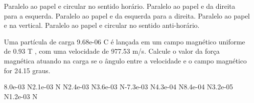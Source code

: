 \documentclass[12pt, addpoints]{exam}
\begin{document}
\begin{questions}
\begin{multicols*}{2}
\begin{choices}
\choice Paralelo ao papel e circular no sentido horário. 
\choice Paralelo ao papel e da direita para a esquerda. 
\choice Paralelo ao papel e da esquerda para a direita. 
\choice Paralelo ao papel e na vertical. 
\choice Paralelo ao papel e circular no sentido anti-horário. 
\end{choices}
\question Uma partícula de carga 9.68e-06 C é lançada em um campo magnético uniforme de    0.93 T , com uma velocidade de 977.53 m/s. Calcule o valor da força magnética atuando na carga se o ângulo entre a velocidade e o campo magnético for   24.15 graus.

\begin{oneparchoices}
\choice 8.0e-03 N\choice 2.1e-03 N N\choice 2.4e-03 N\choice 3.6e-03 N\choice -7.3e-03 N\choice 4.3e-04 N\choice 8.4e-04 N\choice 3.2e-05 N\choice 1.2e-03 N
\end{oneparchoices}\end{multicols*}
\end{questions}
\newpage
\end{document}

